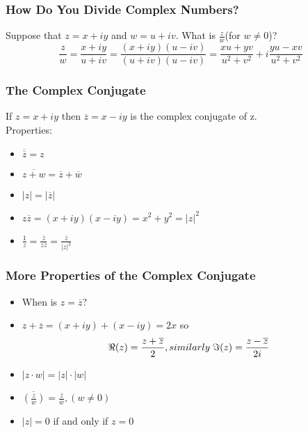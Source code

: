 \documentclass{article}
\begin{document}
\subsubsection{How Do You Divide Complex Numbers?}
Suppose that $z = x +iy$ and $w = u + iv$. What is $\frac{z}{w}$(for $w \neq 0$)?
\begin{equation*}
\frac{z}{w} = \frac{x + iy}{u + iv} = \frac{(x + iy)(u - iv)}{(u + iv)(u - iv)} = \frac{xu + yv}{u^2 + v^2} + i\frac{yu - xv}{u^2 + v^2}
\end{equation*}

\subsubsection{The Complex Conjugate}
If $z = x +iy$ then $\overline{z} = x - iy$ is the complex conjugate of z. \\
Properties:
\begin{itemize}
\item $\overline{\overline{z}} = z$
\item $\overline{z + w} = \overline{z} + \overline{w}$
\item $\left|z\right| = \left|\overline{z}\right|$
\item $z\overline{z} = (x + iy)(x - iy) = x^2 + y^2 = \left|z\right|^2$
\item $\frac{1}{z} = \frac{\overline{z}}{z\overline{z}} = \frac{\overline{z}}{\left|z\right|^2}$
\end{itemize}

\subsubsection{More Properties of the Complex Conjugate}
\begin{itemize}
\item When is $z = \overline{z}$?
\item $z + \overline{z} = (x + iy) + (x - iy) = 2x$ so
\begin{equation*}
\Re(z) = \frac{z + \overline{z}}{2}, similarly \hspace{0.1cm} \Im(z) = \frac{z - \overline{z}}{2i}
\end{equation*}
\item $\left|z \cdot w\right| = \left|z\right| \cdot \left|w\right|$
\item $\overline{(\frac{z}{w})} = \frac{\overline{z}}{\overline{w}}, (w \neq 0)$
\item $\left|z\right| = 0$ if and only if $z = 0$
\end{itemize}
\end{document}
